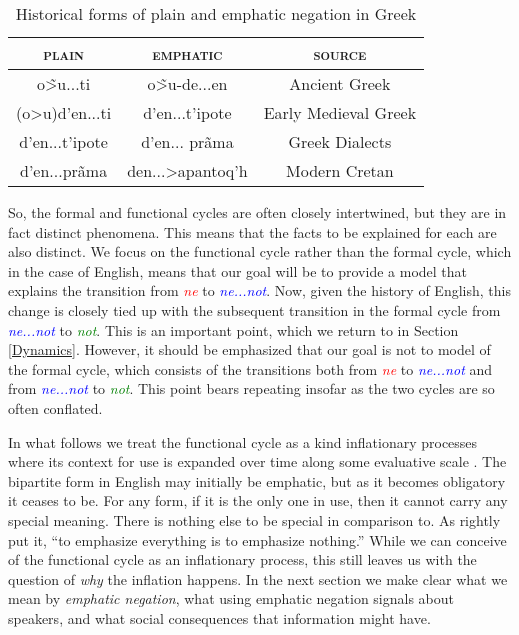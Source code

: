 \documentclass[linguex]{sp}
\theoremstyle{definition} \newtheorem{definition}{Definition}
\begin{document}
\begin{table}
    \begin{center}
    \begin{tabular}{@{}ccc@{}}
      \hline
      \textsc{plain} & \textsc{emphatic} & \textsc{source} \\
      \hline
      \textgreek{o\~>u...ti} & \textgreek{o\~>u-de...en} & Ancient Greek \\
      \textgreek{(o>u)d'en...ti} & \textgreek{d'en...t'ipote} & Early Medieval Greek \\
      \textgreek{d'en...t'ipote} & \textgreek{d'en... pr\~ama} & Greek Dialects \\
      \textgreek{d'en...pr\~ama} & \textgreek{den...>apantoq'h} & Modern Cretan \\
      \hline
    \end{tabular}
    \end{center}
    \caption{Historical forms of plain and emphatic negation in Greek}
    \label{greek-table}
\end{table}

So, the formal and functional cycles are often closely intertwined, but they are in fact distinct phenomena. This means that the facts to be explained for each are also distinct.  We focus on the functional cycle rather than the formal cycle, which in the case of English, means that our goal will be to provide a model that explains the transition from \emph{\textcolor{red}{ne}} to \emph{\textcolor{blue}{ne...not}}. Now, given the history of English, this change is closely tied up with the subsequent transition in the formal cycle from \emph{\textcolor{blue}{ne...not}}  to  \emph{\textcolor{green}{not}}. This is an important point, which we return to in Section \ref{Dynamics}. However, it should be emphasized that our goal is not to model of the formal cycle, which consists of the transitions both from \emph{\textcolor{red}{ne}} to \emph{\textcolor{blue}{ne...not}} and from \emph{\textcolor{blue}{ne...not}}  to  \emph{\textcolor{green}{not}}. This point bears repeating insofar as the two cycles are so often conflated.

In what follows  we treat the functional cycle as a kind inflationary processes where its context for use is expanded over time along some evaluative scale \citep{dahl:2001}. The bipartite form in English may initially be emphatic, but as it becomes obligatory it ceases to be. For any form, if it is the only one in use, then it cannot carry any special meaning. There is nothing else to be special in comparison to. As \citet[5]{kiparsky-condoravdi:2006} rightly put it, ``to emphasize everything is to emphasize nothing.''  While we can conceive of the functional cycle as an inflationary process, this still leaves us with the question of \emph{why} the inflation happens. In the next section we make clear what we mean by \emph{emphatic negation}, what using emphatic negation signals about speakers, and what social consequences that information might have.
\end{document}
